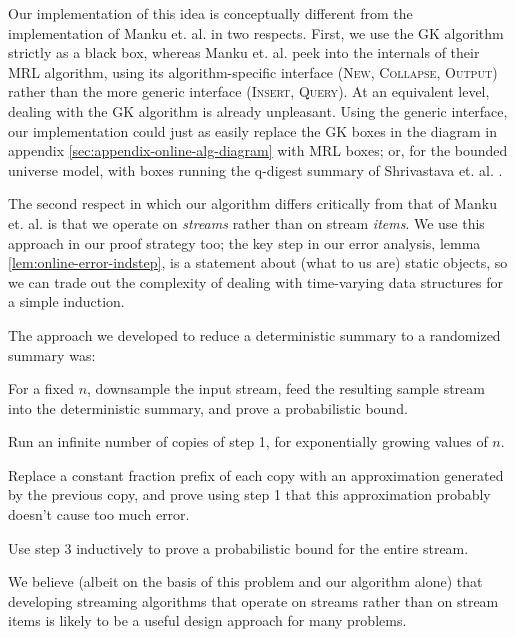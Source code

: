 \documentclass{article}
\theoremstyle{plain}
\begin{document}
Our implementation of this idea is conceptually different from the
implementation of Manku et. al. in two respects. First, we use the GK algorithm
strictly as a black box, whereas Manku et. al. peek into the internals of their
MRL algorithm, using its algorithm-specific interface (\textsc{New},
\textsc{Collapse}, \textsc{Output}) rather than the more generic interface
(\textsc{Insert}, \textsc{Query}). At an equivalent level, dealing with the GK
algorithm is already unpleasant. Using the generic interface, our implementation
could just as easily replace the GK boxes in the diagram in appendix
\ref{sec:appendix-online-alg-diagram} with MRL boxes; or, for the bounded
universe model, with boxes running the q-digest summary of Shrivastava et. al.
\cite{SBAS2004}.

The second respect in which our algorithm differs critically from that of Manku
et. al. is that we operate on \emph{streams} rather than on stream \emph{items}.
We use this approach in our proof strategy too; the key step in our error
analysis, lemma \ref{lem:online-error-indstep}, is a statement about (what to us
are) static objects, so we can trade out the complexity of dealing with
time-varying data structures for a simple induction.

The approach we developed to reduce a deterministic summary to a randomized
summary was:
\begin{enumerate*}
\item For a fixed $n$, downsample the input stream, feed the resulting sample
  stream into the deterministic summary, and prove a probabilistic bound.
\item Run an infinite number of copies of step 1, for exponentially growing
  values of $n$.
\item Replace a constant fraction prefix of each copy with an approximation
  generated by the previous copy, and prove using step 1 that this approximation
  probably doesn't cause too much error.
\item Use step 3 inductively to prove a probabilistic bound for the entire
  stream.
\end{enumerate*}
We believe (albeit on the basis of this problem and our algorithm alone) that
developing streaming algorithms that operate on streams rather than on stream
items is likely to be a useful design approach for many problems.
 


 

\appendix

\newpage
\end{document}
